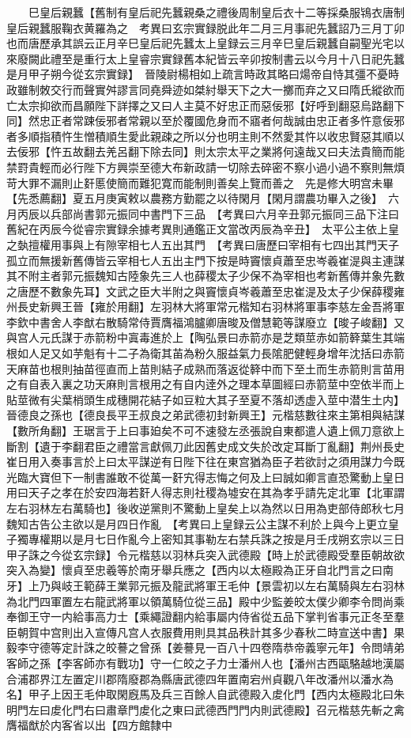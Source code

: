 　　巳皇后親蠶【舊制有皇后祀先蠶親桑之禮後周制皇后衣十二等採桑服鴇衣唐制皇后親蠶服鞠衣黄羅為之　考異曰玄宗實録脱此年二月三月事祀先蠶詔乃三月丁卯也而唐歷承其誤云正月辛巳皇后祀先蠶太上皇録云三月辛巳皇后親蠶自嗣聖光宅以來廢闕此禮至是重行太上皇睿宗實録舊本紀皆云辛卯按制書云以今月十八日祀先蠶是月甲子朔今從玄宗實録】　晉陵尉楊相如上疏言時政其略曰煬帝自恃其彊不憂時政雖制敇交行而聲實舛謬言同堯舜迹如桀紂舉天下之大一擲而弃之又曰隋氏縱欲而亡太宗抑欲而昌願陛下詳擇之又曰人主莫不好忠正而惡佞邪【好呼到翻惡烏路翻下同】然忠正者常踈佞邪者常親以至於覆國危身而不寤者何哉誠由忠正者多忤意佞邪者多順指積忤生憎積順生愛此親疎之所以分也明主則不然愛其忤以收忠賢惡其順以去佞邪【忤五故翻去羌呂翻下除去同】則太宗太平之業將何遠哉又曰夫法貴簡而能禁罸貴輕而必行陛下方興崇至德大布新政請一切除去碎密不察小過小過不察則無煩苛大罪不漏則止姧慝使簡而難犯寛而能制則善矣上覽而善之　先是修大明宫未畢【先悉薦翻】夏五月庚寅敕以農務方勤罷之以待閑月【閑月謂農功畢入之後】　六月丙辰以兵部尚書郭元振同中書門下三品　【考異曰六月辛丑郭元振同三品下注曰舊紀在丙辰今從睿宗實録余據考異則通鑑正文當改丙辰為辛丑】　太平公主依上皇之埶擅權用事與上有隙宰相七人五出其門　【考異曰唐歷曰宰相有七四出其門天子孤立而無援新舊傳皆云宰相七人五出主門下按是時竇懷貞蕭至忠岑羲崔湜與主連謀其不附主者郭元振魏知古陸象先三人也薛稷太子少保不為宰相也考新舊傳并象先數之唐歷不數象先耳】文武之臣大半附之與竇懷貞岑羲蕭至忠崔湜及太子少保薛稷雍州長史新興王晉【雍於用翻】左羽林大將軍常元楷知右羽林將軍事李慈左金吾將軍李欽中書舍人李猷右散騎常侍賈膺福鴻臚卿唐晙及僧慧範等謀廢立【晙子峻翻】又與宫人元氏謀于赤箭粉中寘毒進於上【陶弘景曰赤箭亦是芝類莖赤如箭簳葉生其端根如人足又如芋魁有十二子為衛其苖為粉久服益氣力長隂肥健輕身增年沈括曰赤箭天麻苗也根則抽苗徑直而上苗則結子成熟而落返從簳中而下至土而生赤箭則言苗用之有自表入裏之功天麻則言根用之有自内逹外之理本草圖經曰赤箭莖中空依半而上貼莖微有尖葉梢頭生成穗開花結子如豆粒大其子至夏不落却透虚入莖中潜生土内】晉德良之孫也【德良長平王叔良之弟武德初封新興王】元楷慈數往來主第相與結謀【數所角翻】王琚言于上曰事廹矣不可不速發左丞張說自東都遣人遺上佩刀意欲上斷割【遺于李翻君臣之禮當言獻佩刀此因舊史成文失於改定耳斷丁亂翻】荆州長史崔日用入奏事言於上曰太平謀逆有日陛下往在東宫猶為臣子若欲討之須用謀力今既光臨大寶但下一制書誰敢不從萬一姧宄得志悔之何及上曰誠如卿言直恐驚動上皇日用曰天子之孝在於安四海若姧人得志則社稷為墟安在其為孝乎請先定北軍【北軍謂左右羽林左右萬騎也】後收逆黨則不驚動上皇矣上以為然以日用為吏部侍郎秋七月魏知古告公主欲以是月四日作亂　【考異曰上皇録云公主謀不利於上與今上更立皇子獨專權期以是月七日作亂今上密知其事勒左右禁兵誅之按是月壬戌朔玄宗以三日甲子誅之今從玄宗録】令元楷慈以羽林兵突入武德殿【時上於武德殿受羣臣朝故欲突入為變】懷貞至忠羲等於南牙舉兵應之【西内以太極殿為正牙自北門言之曰南牙】上乃與岐王範薛王業郭元振及龍武將軍王毛仲【景雲初以左右萬騎與左右羽林為北門四軍置左右龍武將軍以領萬騎位從三品】殿中少監姜皎太僕少卿李令問尚乘奉御王守一内給事高力士【乘繩證翻内給事屬内侍省從五品下掌判省事元正冬至羣臣朝賀中宫則出入宣傳凡宫人衣服費用則具其品秩計其多少春秋二時宣送中書】果毅李守德等定計誅之皎謩之曾孫【姜謩見一百八十四卷隋恭帝義寧元年】令問靖弟客師之孫【李客師亦有戰功】守一仁皎之子力士潘州人也【潘州古西甌駱越地漢屬合浦郡界江左置定川郡隋廢郡為縣唐武德四年置南宕州貞觀八年改潘州以潘水為名】甲子上因王毛仲取閑廐馬及兵三百餘人自武德殿入䖍化門【西内太極殿北曰朱明門左曰䖍化門右曰肅章門䖍化之東曰武德西門門内則武德殿】召元楷慈先斬之禽膺福猷於内客省以出【四方館隸中
